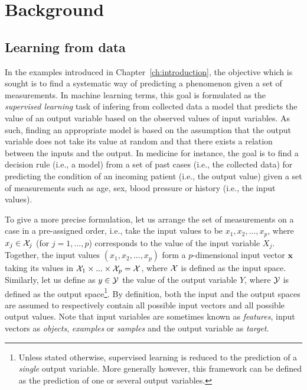 \chapter{Background}\label{ch:background}

\section{Learning from data}

In the examples introduced in Chapter~\ref{ch:introduction}, the objective
which is sought is to find a systematic way of predicting a phenomenon given a
set of measurements. In machine learning terms, this goal is formulated as the
{\it supervised learning} task of infering from collected data a model that
predicts the value of an output variable based on the observed values of input
variables. As such, finding an appropriate model is based on the assumption
that the output variable does not take its value at random and that there
exists a relation between the inputs and the output. In medicine for instance,
the goal is to find a decision rule (i.e., a model) from a set of past cases
(i.e., the collected data) for predicting the condition of an incoming patient
(i.e., the output value) given a set of measurements such as age, sex, blood
pressure or history (i.e., the input values).

To give a more precise formulation, let us arrange the set of measurements on a
case in a pre-assigned order, i.e., take the input values to be $x_1, x_2, ...,
x_p$, where $x_j \in {\cal X}_j$ (for $j = 1, ..., p$) corresponds to the value
of the input variable $X_j$. Together, the input values $(x_1, x_2, ..., x_p)$
form a $p$-dimensional input vector $\mathbf{x}$ taking its values in ${\cal
X}_1 \times ... \times {\cal X}_p = {\cal X}$, where ${\cal X}$ is defined as
the input space. Similarly, let us define as $y \in {\cal Y}$ the value of the
output variable $Y$, where ${\cal Y}$ is defined as the output
space\footnote{Unless stated otherwise, supervised learning is reduced to the
prediction of a \textit{single} output variable. More generally however, this
framework can be defined as the prediction of one or several output variables.}.
By definition, both the input and the output spaces are assumed to respectively
contain all possible input vectors and all possible output values. Note that
input variables are sometimes known as {\it features}, input vectors as {\it
objects}, {\it examples} or {\it samples} and the output variable as {\it
target}.

